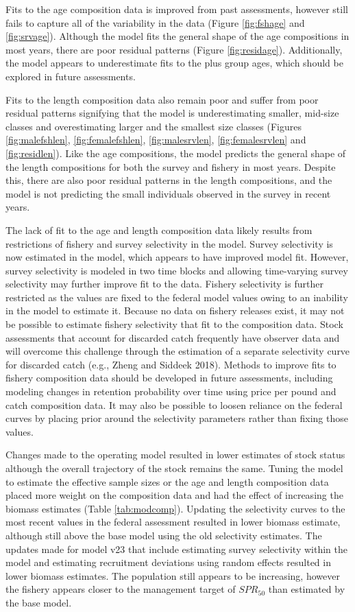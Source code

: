 \documentclass[
]{article}
\begin{document}
Fits to the age composition data is improved from past assessments, however still fails to capture all of the variability in the data (Figure \ref{fig:fshage} and \ref{fig:srvage}). Although the model fits the general shape of the age compositions in most years, there are poor residual patterns (Figure \ref{fig:residage}). Additionally, the model appears to underestimate fits to the plus group ages, which should be explored in future assessments.

Fits to the length composition data also remain poor and suffer from poor residual patterns signifying that the model is underestimating smaller, mid-size classes and overestimating larger and the smallest size classes (Figures \ref{fig:malefshlen}, \ref{fig:femalefshlen}, \ref{fig:malesrvlen}, \ref{fig:femalesrvlen} and \ref{fig:residlen}). Like the age compositions, the model predicts the general shape of the length compositions for both the survey and fishery in most years. Despite this, there are also poor residual patterns in the length compositions, and the model is not predicting the small individuals observed in the survey in recent years.

The lack of fit to the age and length composition data likely results from restrictions of fishery and survey selectivity in the model. Survey selectivity is now estimated in the model, which appears to have improved model fit. However, survey selectivity is modeled in two time blocks and allowing time-varying survey selectivity may further improve fit to the data. Fishery selectivity is further restricted as the values are fixed to the federal model values owing to an inability in the model to estimate it. Because no data on fishery releases exist, it may not be possible to estimate fishery selectivity that fit to the composition data. Stock assessments that account for discarded catch frequently have observer data and will overcome this challenge through the estimation of a separate selectivity curve for discarded catch (e.g., Zheng and Siddeek 2018). Methods to improve fits to fishery composition data should be developed in future assessments, including modeling changes in retention probability over time using price per pound and catch composition data. It may also be possible to loosen reliance on the federal curves by placing prior around the selectivity parameters rather than fixing those values.

Changes made to the operating model resulted in lower estimates of stock status although the overall trajectory of the stock remains the same. Tuning the model to estimate the effective sample sizes or the age and length composition data placed more weight on the composition data and had the effect of increasing the biomass estimates (Table \ref{tab:modcomp}). Updating the selectivity curves to the most recent values in the federal assessment resulted in lower biomass estimate, although still above the base model using the old selectivity estimates. The updates made for model v23 that include estimating survey selectivity within the model and estimating recruitment deviations using random effects resulted in lower biomass estimates. The population still appears to be increasing, however the fishery appears closer to the management target of \(SPR_{50}\) than estimated by the base model.
\end{document}
